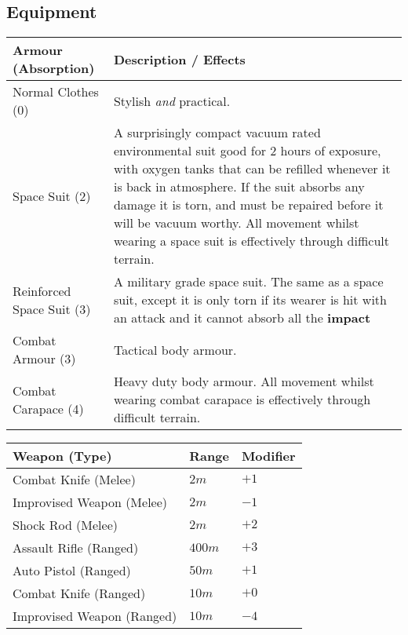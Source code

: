 \documentclass[11pt]{article}
\begin{document}
\begin{multicols}{3}
  \subsection*{Equipment}

  \begin{tabularx}{\linewidth}{lX}
    Armour (Absorption) & Description / Effects \\
    \hline
    Normal Clothes (0) & Stylish \textit{and} practical. \\
    Space Suit (2) & A surprisingly compact vacuum rated environmental suit good for $2$ hours of exposure, with oxygen tanks that can be refilled whenever it is back in atmosphere. If the suit absorbs any damage it is torn, and must be repaired before it will be vacuum worthy. All movement whilst wearing a space suit is effectively through difficult terrain. \\
    Reinforced Space Suit (3) & A military grade space suit. The same as a space suit, except it is only torn if its wearer is hit with an attack and it cannot absorb all the \textbf{impact} \\
    Combat Armour (3) & Tactical body armour. \\
    Combat Carapace (4) & Heavy duty body armour. All movement whilst wearing combat carapace is effectively through difficult terrain.
  \end{tabularx}

  \begin{tabularx}{\linewidth}{lXX}
    Weapon (Type) & Range & Modifier \\
    \hline
    Combat Knife (Melee) & $2m$ & $+1$ \\
    Improvised Weapon (Melee) & $2m$ & $-1$ \\
    Shock Rod (Melee) & $2m$ & $+2$ \\
    Assault Rifle (Ranged) & $400m$ & $+3$ \\
    Auto Pistol (Ranged) & $50m$ & $+1$ \\
    Combat Knife (Ranged) & $10m$ & $+0$ \\
    Improvised Weapon (Ranged) & $10m$ & $-4$
  \end{tabularx}


\end{multicols}
\end{document}

